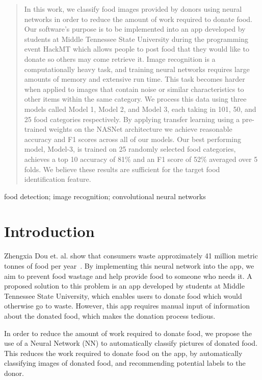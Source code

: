 \documentclass[conference]{IEEEtran}
\begin{document}
\begin{abstract}
 In this work, we classify food images provided by donors using neural networks in order to reduce the amount of work required to donate food. Our software's purpose is to be implemented into an app developed by students at Middle Tennessee State University during the programming event HackMT which allows people to post food that they would like to donate so others may come retrieve it. Image recognition is a computationally heavy task, and training neural networks requires large amounts of memory and extensive run time. This task becomes harder when applied to images that contain noise or similar characteristics to other items within the same category. We process this data using three models called Model 1, Model 2, and Model 3, each taking in 101, 50, and 25 food categories respectively. By applying transfer learning using a pre-trained weights on the NASNet architecture we achieve reasonable accuracy and F1 scores across all of our models. Our best performing model, Model-3, is trained on 25 randomly selected food categories, achieves a top 10 accuracy of 81\% and an F1 score of 52\% averaged over 5 folds. We believe these results are sufficient for the target food identification feature. 
\end{abstract}


\begin{IEEEkeywords}
food detection; image recognition; convolutional neural networks
\end{IEEEkeywords}

\section{Introduction}

Zhengxia Dou et. al. show that consumers waste approximately 41 million metric tonnes of food per year~\cite{Food_Waste}. By implementing this neural network into the app, we aim to prevent food wastage and help provide food to someone who needs it. A proposed solution to this problem is an app developed by students at Middle Tennessee State University, which enables users to donate food which would otherwise go to waste. However, this app requires manual input of information about the donated food, which makes the donation process tedious.

In order to reduce the amount of work required to donate food, we propose the use of a Neural Network (NN) to automatically classify pictures of donated food. This reduces the work required to donate food on the app, by automatically classifying images of donated food, and recommending potential labels to the donor.
\end{document}
